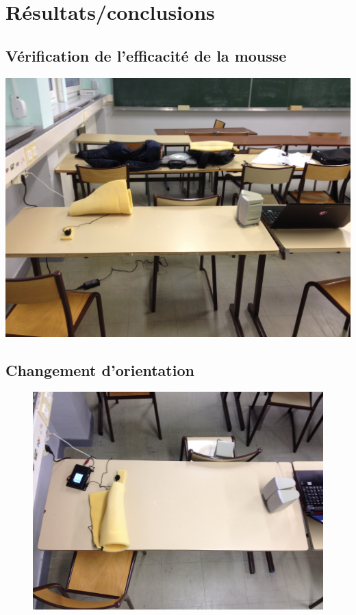 \documentclass[12pt,a4paper]{report}
\begin{document}
\section{Résultats/conclusions}


\subsection{Vérification de l'efficacité de la mousse}
\includegraphics[width=\textwidth]{../tests/test_du_protocole/cone_face.jpg} 

\subsection{Changement d'orientation}


\begin{figure}[H]
\includegraphics[width=\textwidth]{../tests/test_du_protocole/cone_dos_a_dos.jpg} 
\end{figure}
\end{document}
